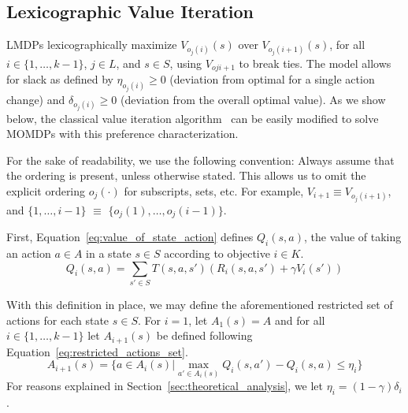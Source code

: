 \subsection{Lexicographic Value Iteration}
\label{sec:lvi}

LMDPs lexicographically maximize $V_{o_j(i)}(s)$ over $V_{o_j(i+1)}(s)$, for all $i \in \{1, \ldots, k - 1\}$, $j \in L$, and $s \in S$, using $V_{oj{i+1}}$ to break ties. The model allows for slack as defined by $\eta_{o_j(i)} \geq 0$ (deviation from optimal for a single action change) and $\delta_{o_j(i)} \geq 0$ (deviation from the overall optimal value). As we show below, the classical value iteration algorithm~\cite{Bellman57} can be easily modified to solve MOMDPs with this preference characterization.

For the sake of readability, we use the following convention: Always assume that the ordering is present, unless otherwise stated. 
This allows us to omit the explicit ordering $o_j(\cdot)$ for subscripts, sets, etc. For example, $V_{i+1} \equiv V_{o_j(i+1)}$, and $\{1, \ldots, i - 1\}$ $\equiv$ $\{o_j(1), \ldots, o_j(i - 1)\}$.



First, Equation~\ref{eq:value_of_state_action} defines $Q_i(s, a)$, the value of taking an action $a \in A$ in a state $s \in S$ according to objective $i \in K$.
\begin{equation}
    \label{eq:value_of_state_action}
    Q_i(s, a) = \sum_{s' \in S} T(s, a, s') (R_i(s, a, s') + \gamma V_i(s'))
\end{equation}

With this definition in place, we may define the aforementioned restricted set of actions for each state $s \in S$. For $i = 1$, let $A_1(s) = A$ and for all $i \in \{1, \ldots, k - 1\}$ let $A_{i+1}(s)$ be defined following Equation~\ref{eq:restricted_actions_set}.
\begin{equation}
    \label{eq:restricted_actions_set}
    A_{i+1}(s) = \{ a \in A_i(s) | \max_{a' \in A_i(s)} Q_i(s, a') - Q_i(s, a) \leq \eta_i \}
\end{equation}
For reasons explained in Section~\ref{sec:theoretical_analysis}, we let $\eta_i = (1 - \gamma) \delta_i$.

